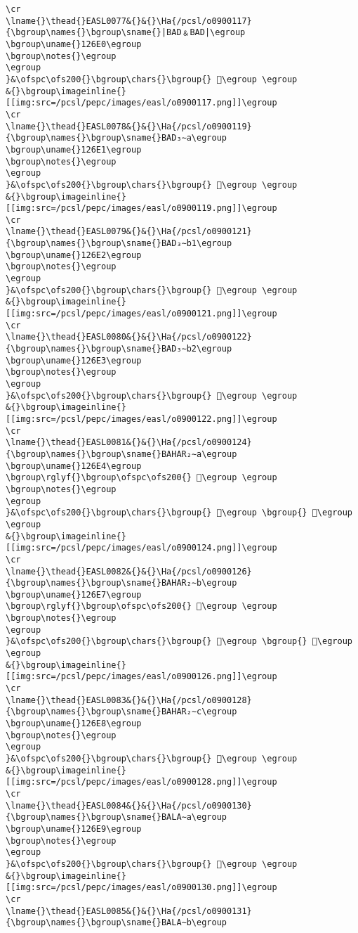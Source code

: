 \begin{verbatim}
\cr
\lname{}\thead{}EASL0077&{}&{}\Ha{/pcsl/o0900117}{\bgroup\names{}\bgroup\sname{}|BAD﹠BAD|\egroup
\bgroup\uname{}126E0\egroup
\bgroup\notes{}\egroup
\egroup
}&\ofspc\ofs200{}\bgroup\chars{}\bgroup{} 𒛠\egroup \egroup
&{}\bgroup\imageinline{}[[img:src=/pcsl/pepc/images/easl/o0900117.png]]\egroup
\cr
\lname{}\thead{}EASL0078&{}&{}\Ha{/pcsl/o0900119}{\bgroup\names{}\bgroup\sname{}BAD₃∼a\egroup
\bgroup\uname{}126E1\egroup
\bgroup\notes{}\egroup
\egroup
}&\ofspc\ofs200{}\bgroup\chars{}\bgroup{} 𒛡\egroup \egroup
&{}\bgroup\imageinline{}[[img:src=/pcsl/pepc/images/easl/o0900119.png]]\egroup
\cr
\lname{}\thead{}EASL0079&{}&{}\Ha{/pcsl/o0900121}{\bgroup\names{}\bgroup\sname{}BAD₃∼b1\egroup
\bgroup\uname{}126E2\egroup
\bgroup\notes{}\egroup
\egroup
}&\ofspc\ofs200{}\bgroup\chars{}\bgroup{} 𒛢\egroup \egroup
&{}\bgroup\imageinline{}[[img:src=/pcsl/pepc/images/easl/o0900121.png]]\egroup
\cr
\lname{}\thead{}EASL0080&{}&{}\Ha{/pcsl/o0900122}{\bgroup\names{}\bgroup\sname{}BAD₃∼b2\egroup
\bgroup\uname{}126E3\egroup
\bgroup\notes{}\egroup
\egroup
}&\ofspc\ofs200{}\bgroup\chars{}\bgroup{} 𒛣\egroup \egroup
&{}\bgroup\imageinline{}[[img:src=/pcsl/pepc/images/easl/o0900122.png]]\egroup
\cr
\lname{}\thead{}EASL0081&{}&{}\Ha{/pcsl/o0900124}{\bgroup\names{}\bgroup\sname{}BAHAR₂∼a\egroup
\bgroup\uname{}126E4\egroup
\bgroup\rglyf{}\bgroup\ofspc\ofs200{} 𒛤\egroup \egroup
\bgroup\notes{}\egroup
\egroup
}&\ofspc\ofs200{}\bgroup\chars{}\bgroup{} 𒛤\egroup \bgroup{} 𒛥\egroup \egroup
&{}\bgroup\imageinline{}[[img:src=/pcsl/pepc/images/easl/o0900124.png]]\egroup
\cr
\lname{}\thead{}EASL0082&{}&{}\Ha{/pcsl/o0900126}{\bgroup\names{}\bgroup\sname{}BAHAR₂∼b\egroup
\bgroup\uname{}126E7\egroup
\bgroup\rglyf{}\bgroup\ofspc\ofs200{} 𒛧\egroup \egroup
\bgroup\notes{}\egroup
\egroup
}&\ofspc\ofs200{}\bgroup\chars{}\bgroup{} 𒛦\egroup \bgroup{} 𒛧\egroup \egroup
&{}\bgroup\imageinline{}[[img:src=/pcsl/pepc/images/easl/o0900126.png]]\egroup
\cr
\lname{}\thead{}EASL0083&{}&{}\Ha{/pcsl/o0900128}{\bgroup\names{}\bgroup\sname{}BAHAR₂∼c\egroup
\bgroup\uname{}126E8\egroup
\bgroup\notes{}\egroup
\egroup
}&\ofspc\ofs200{}\bgroup\chars{}\bgroup{} 𒛨\egroup \egroup
&{}\bgroup\imageinline{}[[img:src=/pcsl/pepc/images/easl/o0900128.png]]\egroup
\cr
\lname{}\thead{}EASL0084&{}&{}\Ha{/pcsl/o0900130}{\bgroup\names{}\bgroup\sname{}BALA∼a\egroup
\bgroup\uname{}126E9\egroup
\bgroup\notes{}\egroup
\egroup
}&\ofspc\ofs200{}\bgroup\chars{}\bgroup{} 𒛩\egroup \egroup
&{}\bgroup\imageinline{}[[img:src=/pcsl/pepc/images/easl/o0900130.png]]\egroup
\cr
\lname{}\thead{}EASL0085&{}&{}\Ha{/pcsl/o0900131}{\bgroup\names{}\bgroup\sname{}BALA∼b\egroup

\end{verbatim}
